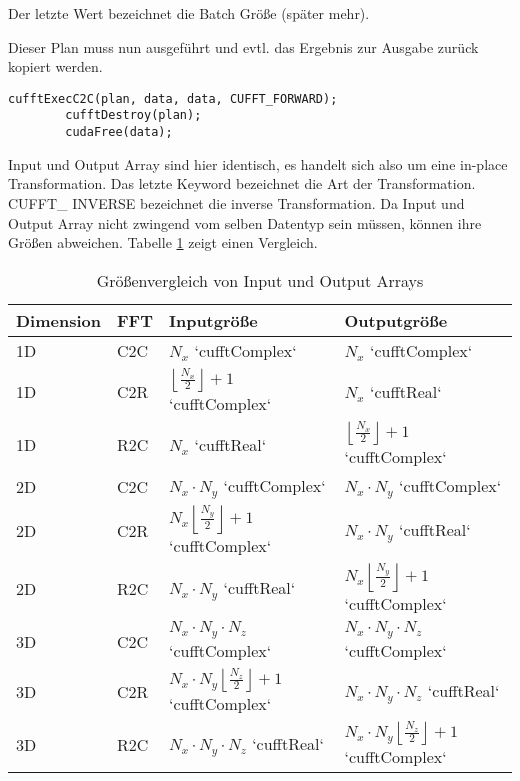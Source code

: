 		Der letzte Wert bezeichnet die Batch Größe (später mehr).
	    
		Dieser Plan muss nun ausgeführt und evtl. das Ergebnis zur Ausgabe zurück kopiert werden.
		
		\begin{lstlisting}[caption=cuFFT: Ausführen]
		cufftExecC2C(plan, data, data, CUFFT_FORWARD);
		cufftDestroy(plan);
		cudaFree(data);
		\end{lstlisting}
		
		Input und Output Array sind hier identisch, es handelt sich also um eine in-place Transformation. Das letzte Keyword bezeichnet die Art der Transformation. CUFFT\_ INVERSE bezeichnet die inverse Transformation. Da Input und Output Array nicht zwingend vom selben Datentyp sein müssen, können ihre Größen abweichen. Tabelle \ref{tab6:size} zeigt einen Vergleich.
		
		\begin{table}[h]
		    \centering
		    \begin{tabular}{llll}
			    \toprule
        			Dimension & FFT & Inputgröße & Outputgröße \\ \midrule
        		    	1D & C2C & $N_x$ \li`cufftComplex` & $N_x$ \li`cufftComplex` \\
			    1D & C2R & $\left \lfloor{\frac{N_x}{2}}\right \rfloor + 1$ \li`cufftComplex` & $N_x$ \li`cufftReal` \\
		        	1D & R2C & $N_x$ \li`cufftReal` & $\left \lfloor{\frac{N_x}{2}}\right \rfloor + 1$ \li`cufftComplex` \\ \hline
        			2D & C2C & $N_x\cdot N_y$ \li`cufftComplex` & $N_x\cdot N_y$ \li`cufftComplex` \\
		        	2D & C2R & $N_x\left \lfloor{\frac{N_y}{2}}\right \rfloor + 1$ \li`cufftComplex` & $N_x\cdot N_y$ \li`cufftReal` \\
        			2D & R2C & $N_x\cdot N_y$ \li`cufftReal` & $N_x\left \lfloor{\frac{N_y}{2}}\right \rfloor + 1$ \li`cufftComplex` \\ \hline
		        	3D & C2C & $N_x\cdot N_y\cdot N_z$ \li`cufftComplex` & $N_x\cdot N_y\cdot N_z$ \li`cufftComplex` \\
        			3D & C2R & $N_x\cdot N_y\left \lfloor{\frac{N_z}{2}}\right \rfloor + 1$ \li`cufftComplex` & $N_x\cdot N_y\cdot N_z$ \li`cufftReal` \\
		        	3D & R2C & $N_x\cdot N_y\cdot N_z$ \li`cufftReal` & $N_x\cdot N_y\left \lfloor{\frac{N_z}{2}}\right \rfloor + 1$ \li`cufftComplex` \\ \bottomrule
        		\end{tabular}
		    \caption[cuFFT Arraygrößen]{Größenvergleich von Input und Output Arrays}
		    \label{tab6:size}
		\end{table}
	
